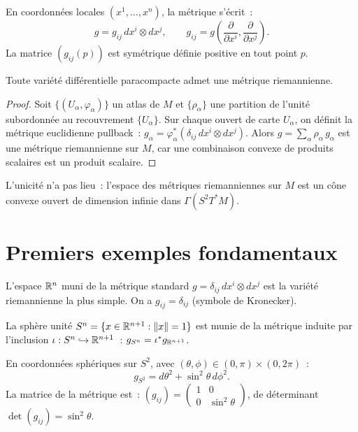En coordonn\'ees locales $(x^1, \ldots, x^n)$, la m\'etrique s'\'ecrit~:
\[
    g = g_{ij} \, dx^i \otimes dx^j, \qquad
    g_{ij} = g\!\left(\frac{\partial}{\partial x^i}, \frac{\partial}{\partial x^j}\right).
\]
La matrice $(g_{ij}(p))$ est sym\'etrique d\'efinie positive en tout point $p$.

\begin{theoreme}
Toute vari\'et\'e diff\'erentielle paracompacte admet une m\'etrique riemannienne.
\end{theoreme}

\begin{proof}
Soit $\{(U_\alpha, \varphi_\alpha)\}$ un atlas de $M$ et $\{\rho_\alpha\}$ une
partition de l'unit\'e subordonn\'ee au recouvrement $\{U_\alpha\}$. Sur chaque
ouvert de carte $U_\alpha$, on d\'efinit la m\'etrique euclidienne pullback~:
$g_\alpha = \varphi_\alpha^*(\delta_{ij}\, dx^i \otimes dx^j)$.
Alors $g = \sum_\alpha \rho_\alpha \, g_\alpha$ est une m\'etrique riemannienne
sur $M$, car une combinaison convexe de produits scalaires est un produit scalaire.
\end{proof}

\begin{remarque}
L'unicit\'e n'a pas lieu~: l'espace des m\'etriques riemanniennes sur $M$ est un
c\^one convexe ouvert de dimension infinie dans $\Gamma(S^2 T^*M)$.
\end{remarque}

\section{Premiers exemples fondamentaux}

\begin{exemple}
L'espace $\mathbb{R}^n$ muni de la m\'etrique standard $g = \delta_{ij}\, dx^i \otimes dx^j$
est la vari\'et\'e riemannienne la plus simple. On a $g_{ij} = \delta_{ij}$ (symbole
de Kronecker).
\end{exemple}

\begin{exemple}
\label{ex:sphere}
La sph\`ere unit\'e $S^n = \{x \in \mathbb{R}^{n+1} : \left\| x \right\| = 1\}$ est munie de la
m\'etrique induite par l'inclusion $\iota : S^n \hookrightarrow \mathbb{R}^{n+1}$~:
$g_{S^n} = \iota^* g_{\mathbb{R}^{n+1}}$.

En coordonn\'ees sph\'eriques sur $S^2$, avec $(\theta, \phi) \in (0,\pi) \times (0,2\pi)$~:
\[
    g_{S^2} = d\theta^2 + \sin^2\!\theta \, d\phi^2.
\]
La matrice de la m\'etrique est~:
$\displaystyle (g_{ij}) = \begin{pmatrix} 1 & 0 \\ 0 & \sin^2\!\theta \end{pmatrix}$,
de d\'eterminant $\det(g_{ij}) = \sin^2\!\theta$.
\end{exemple}

